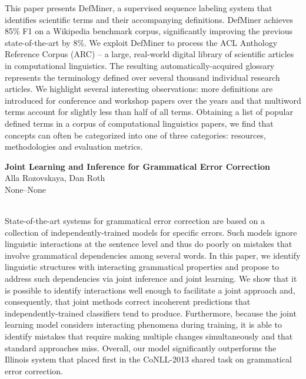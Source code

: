 \documentclass[twoside,makeidx]{book}
\begin{document}
\nopagebreak%
\noindent%
{\small This paper presents DefMiner, a supervised sequence labeling system that identifies scientific terms and their accompanying definitions. DefMiner achieves 85\% F1 on a Wikipedia benchmark corpus, significantly improving the previous state-of-the-art by 8\%.  We exploit DefMiner to process the ACL Anthology Reference Corpus (ARC) -- a large, real-world digital library of scientific articles in computational linguistics.  The resulting automatically-acquired glossary represents the terminology defined over several thousand individual research articles.  We highlight several interesting observations: more definitions are introduced for conference and workshop papers over the years and that multiword terms account for slightly less than half of all terms. Obtaining a list of popular defined terms in a corpus of computational linguistics papers, we find that concepts can often be categorized into one of three categories: resources, methodologies and evaluation metrics.}
\par\vspace{2em}\noindent%
\begin{minipage}{\linewidth}%
\begin{center}
\textbf{\normalsize Joint Learning and Inference for Grammatical Error Correction}\\
\normalsize  Alla Rozovskaya,  Dan Roth\\
{\small None--None}\\
\end{center}
\end{minipage}\\[0.5em]
\nopagebreak%
\noindent%
{\small State-of-the-art systems for grammatical error correction are based on a collection of independently-trained models for specific errors. Such models ignore linguistic interactions at the sentence level and thus do poorly on mistakes that involve grammatical dependencies among several words. In this paper, we identify linguistic structures with interacting grammatical properties and propose to address such dependencies via joint inference and joint learning.  We show that it is possible to identify interactions well enough to facilitate a joint approach and, consequently, that joint methods correct incoherent predictions that independently-trained classifiers tend to produce. Furthermore, because the joint learning model considers interacting phenomena during training, it is able to identify mistakes that require making multiple changes simultaneously and that standard approaches miss. Overall, our model significantly outperforms the Illinois system that placed first in the CoNLL-2013 shared task on grammatical error correction.}
\end{document}
